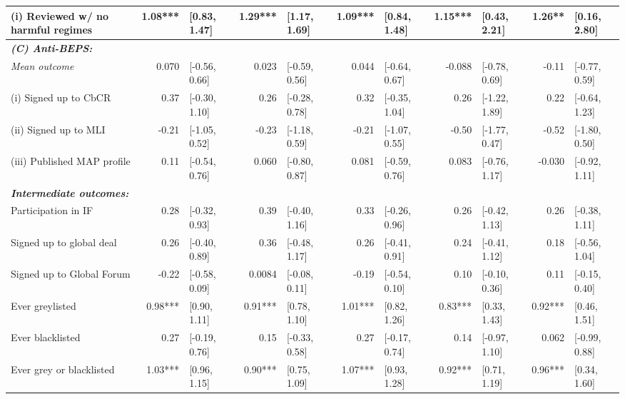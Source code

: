 \begin{adjustbox}{max width=\textwidth}
\begin{tabular}{l*{5}{r@{\hspace{3pt}}l}}
\hspace{.3cm} (i) Reviewed w/ no harmful regimes& 1.08*** & [0.83, 1.47] & 1.29*** & [1.17, 1.69] & 1.09*** & [0.84, 1.48] & 1.15*** & [0.43, 2.21] & 1.26** & [0.16, 2.80] \\
\midrule \emph{{\bf (C) Anti-BEPS: }}&&&&&&&&&&\\
\hspace{.3cm} \emph{Mean outcome}& 0.070 & [-0.56, 0.66] & 0.023 & [-0.59, 0.56] & 0.044 & [-0.64, 0.67] & -0.088 & [-0.78, 0.69] & -0.11 & [-0.77, 0.59] \\
\hspace{.4cm} (i) Signed up to CbCR& 0.37 & [-0.30, 1.10] & 0.26 & [-0.28, 0.78] & 0.32 & [-0.35, 1.04] & 0.26 & [-1.22, 1.89] & 0.22 & [-0.64, 1.23] \\
\hspace{.4cm} (ii) Signed up to MLI& -0.21 & [-1.05, 0.52] & -0.23 & [-1.18, 0.59] & -0.21 & [-1.07, 0.55] & -0.50 & [-1.77, 0.47] & -0.52 & [-1.80, 0.50] \\
\hspace{.4cm} (iii) Published MAP profile& 0.11 & [-0.54, 0.76] & 0.060 & [-0.80, 0.87] & 0.081 & [-0.59, 0.76] & 0.083 & [-0.76, 1.17] & -0.030 & [-0.92, 1.11] \\
\midrule \emph{{\bf Intermediate outcomes: }}&&&&&&&&&&\\
\hspace{.4cm}  Participation in IF& 0.28 & [-0.32, 0.93] & 0.39 & [-0.40, 1.16] & 0.33 & [-0.26, 0.96] & 0.26 & [-0.42, 1.13] & 0.26 & [-0.38, 1.11] \\
\hspace{.4cm}  Signed up to global deal& 0.26 & [-0.40, 0.89] & 0.36 & [-0.48, 1.17] & 0.26 & [-0.41, 0.91] & 0.24 & [-0.41, 1.12] & 0.18 & [-0.56, 1.04] \\
\hspace{.4cm} Signed up to Global Forum& -0.22 & [-0.58, 0.09] & 0.0084 & [-0.08, 0.11] & -0.19 & [-0.54, 0.10] & 0.10 & [-0.10, 0.36] & 0.11 & [-0.15, 0.40] \\
\hspace{.4cm} Ever greylisted& 0.98*** & [0.90, 1.11] & 0.91*** & [0.78, 1.10] & 1.01*** & [0.82, 1.26] & 0.83*** & [0.33, 1.43] & 0.92*** & [0.46, 1.51] \\
\hspace{.4cm} Ever blacklisted& 0.27 & [-0.19, 0.76] & 0.15 & [-0.33, 0.58] & 0.27 & [-0.17, 0.74] & 0.14 & [-0.97, 1.10] & 0.062 & [-0.99, 0.88] \\
\hspace{.4cm} Ever grey or blacklisted& 1.03*** & [0.96, 1.15] & 0.90*** & [0.75, 1.09] & 1.07*** & [0.93, 1.28] & 0.92*** & [0.71, 1.19] & 0.96*** & [0.34, 1.60] \\

\end{tabular}
\end{adjustbox}
